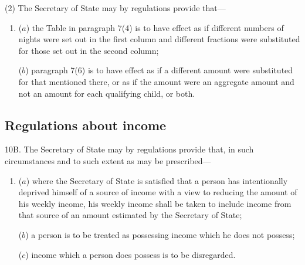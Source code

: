 \documentclass[a4paper]{article}
\begin{document}
{(2) The Secretary of State may by regulations provide that---
\begin{enumerate}\item[]
($a$) the Table in paragraph 7(4) is to have effect as if different numbers of nights were set out in the first column and different fractions were substituted for those set out in the second column;

($b$) paragraph 7(6) is to have effect as if a different amount were substituted for that mentioned there, or as if the amount were an aggregate amount and not an amount for each qualifying child, or both.
\end{enumerate}


\subsection*{Regulations about income}

10B. The Secretary of State may by regulations provide that, in such circumstances and to such extent as may be prescribed---
\begin{enumerate}\item[]
($a$) where the Secretary of State is satisfied that a person has intentionally deprived himself of a source of income with a view to reducing the amount of his  weekly income, his  weekly income shall be taken to include income from that source of an amount estimated by the Secretary of State;

($b$) a person is to be treated as possessing income which he does not possess;

($c$) income which a person does possess is to be disregarded.
\end{enumerate}


}
\end{document}

